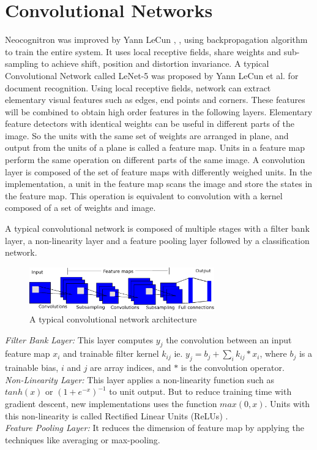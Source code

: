 \documentclass{article}
\begin{document}
\section{Convolutional Networks}
\par Neocognitron was improved by  Yann LeCun \cite{lecun-86}, \cite{lecun-89e}, using backpropagation algorithm  to train the entire system. It uses local receptive fields, share weights and  sub-sampling to achieve  shift, position and distortion invariance. A typical Convolutional Network called  LeNet-5 was proposed by   Yann LeCun et al. \cite{LeCun1998}  for document recognition. Using \allowbreak local receptive fields, network can extract elementary visual features such as edges, end points and corners. These features will be combined to obtain high order features in the following layers. Elementary feature detectors with identical weights can be useful in different parts of the image. So the units with  the same set of weights are arranged in plane, and output from  the units of a plane is called  a feature map. Units in  a feature map perform the same operation on different parts of the same image. A convolution layer is composed of the set of feature maps with differently weighed units. In the implementation, a unit in the feature map scans the image and store the states in the feature map. This operation is equivalent to convolution with a kernel composed of a  set of weights and image. 

\par
A typical convolutional  network is composed of multiple stages with a filter bank layer, a non-linearity layer and a feature pooling layer \cite{lecun2010convolutional} followed by a classification network.\\
\begin{figure}[ht]

 \includegraphics[width=8cm]{Figures/convent.eps}
\caption{A typical convolutional network architecture }
\label{net}
\end{figure}
\emph{Filter Bank Layer:} This layer computes $y_{j}$ the convolution between an input feature map   $x_i$ and trainable filter kernel $k_{ij}$ 
 ie. $y_j=b_j+\sum_i {k_{ij}*x_i}$, where $b_j$ is a trainable bias, $i$ and $j$ are  array indices, and $*$ is the convolution operator.\\
\emph{Non-Linearity Layer:} This layer applies a non-linearity function such as $tanh(x)$ or $(1+e^{-x})^{-1}$ to unit output. But to reduce training time with gradient descent, new implementations uses the function $max(0,x)$. Units with this non-linearity is called Rectified Linear Units (ReLUs) \cite{Nair2010}.\\
\emph{Feature Pooling Layer:} It  reduces the dimension of  feature map by applying the techniques like averaging or max-pooling.
\end{document}
